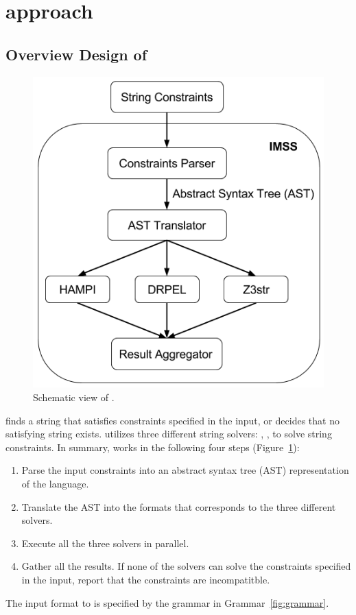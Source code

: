 \section{approach}
\label{sec:approach}

\subsection{Overview Design of \imss}
\begin{figure}[H]
    \center
    \includegraphics[scale=0.45]{imss}
    \caption{\label{fig:imss}Schematic view of \imss.}
\end{figure}
\imss finds a string that satisfies constraints specified in the input,
or decides that no satisfying string exists. \imss utilizes three different
string solvers: \hampi, \dprle, \zstr to solve string
constraints. In summary, \imss works in the following four steps (Figure~\ref{fig:imss}):
\begin{enumerate}
    \item Parse the input constraints into an abstract syntax tree (AST)
    representation of the \imss language.
    \item Translate the AST into the formats that corresponds to the three different solvers.
    \item Execute all the three solvers in parallel.
    \item Gather all the results. If none of the solvers can solve the constraints
    specified in the input, report that the constraints are incompatitble.
\end{enumerate}
The input format to \imss is specified by the grammar in Grammar~\ref{fig:grammar}.

